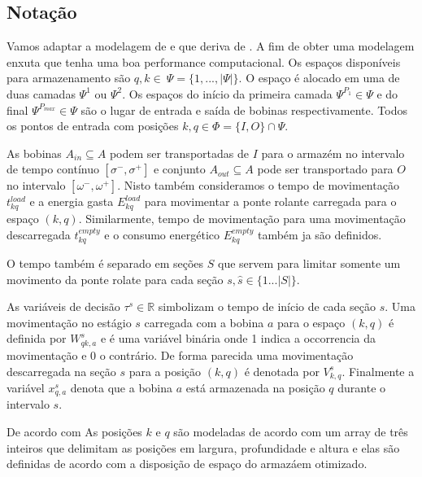 \documentclass[journal]{IEEEtran}
\begin{document}
        \subsection{Notação}
        Vamos adaptar a modelagem de \cite{Weckenborg2025} e que deriva de
        \cite{YUAN2017424}. A fim de obter uma modelagem enxuta que tenha uma
        boa performance computacional. Os espaços disponíveis para armazenamento
        são $q,k\in\ \Psi=\{1,...,|\Psi|\}$. O espaço é alocado em uma de duas 
        camadas $\Psi^1$ ou $\Psi^2$. Os espaços do início da primeira camada
        $\Psi^{P_1}\in\Psi$ e do final $\Psi^{P_{max}}\in\Psi$ são o lugar de 
        entrada e saída de bobinas respectivamente. Todos os pontos de entrada 
        com posições $k,q\in\Phi=\{I,O\}\cap\Psi$.
    
        As bobinas $A_{in}\subseteq{A}$ podem ser transportadas de $I$ para o 
        armazém no intervalo de tempo contínuo $[\sigma^-, \sigma^+]$ e
        conjunto $A_{out}\subseteq{A}$ pode ser transportado para $O$ no intervalo
        $[\omega^-,\omega^+]$. Nisto também consideramos o tempo de movimentação
        $t^{load}_{kq}$ e a energia gasta $E^{load}_{kq}$ para movimentar a ponte
        rolante carregada para o espaço $(k,q)$. Similarmente, tempo de movimentação
        para uma movimentação descarregada $t^{empty}_{kq}$ e o consumo energético 
        $E^{empty}_{kq}$ também ja são definidos. 

        O tempo também é separado em seções $S$ que servem para limitar somente 
        um movimento da ponte rolate para cada seção $s,\hat{s}\in\{1...|S|\}$.

        As variáveis de decisão $\tau^s\in\mathbb{R}$ simbolizam o tempo de 
        início de cada seção $s$. Uma movimentação no estágio $s$ carregada com 
        a bobina $a$ para o espaço $(k,q)$ é definida por $W^{s}_{qk,a}$ e é uma 
        variável binária onde 1 indica a occorrencia da movimentação e 0 o 
        contrário. De forma parecida uma movimentação descarregada na seção $s$
        para a posição $(k,q)$ é denotada por $V^{s}_{k,q}$. Finalmente a variável 
        $x^{s}_{q,a}$ denota que a bobina $a$ está armazenada na posição $q$ 
        durante o intervalo $s$. 

        De acordo com \cite{YUAN2017424} As posições $k$ e $q$ são modeladas de 
        acordo com um array de três inteiros que delimitam as posições em largura,
        profundidade e altura e elas são definidas de acordo com a disposição de
        espaço do armazáem otimizado. 
\end{document}
